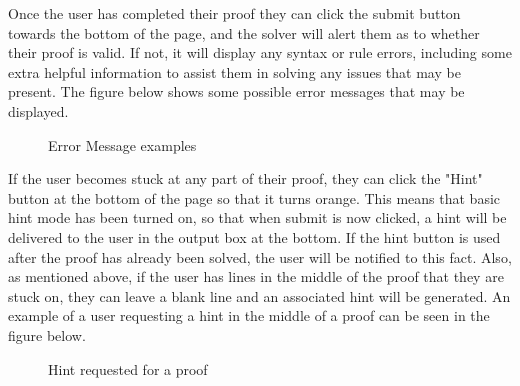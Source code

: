 Once the user has completed their proof they can click the submit button towards the bottom of the page, and the solver will alert them as to whether their proof is valid. If not, it will display any syntax or rule errors, including some extra helpful information to assist them in solving any issues that may be present. The figure below shows some possible error messages that may be displayed.
\pagebreak

\begin{figure}[!ht]
	\centering
	\caption{Error Message examples}
\end{figure}

If the user becomes stuck at any part of their proof, they can click the "Hint" button at the bottom of the page so that it turns orange. This means that basic hint mode has been turned on, so that when submit is now clicked, a hint will be delivered to the user in the output box at the bottom. If the hint button is used after the proof has already been solved, the user will be notified to this fact. Also, as mentioned above, if the user has lines in the middle of the proof that they are stuck on, they can leave a blank line and an associated hint will be generated. An example of a user requesting a hint in the middle of a proof can be seen in the figure below.

\begin{figure}[!ht]
	\centering
	\caption{Hint requested for a proof}
\end{figure}

